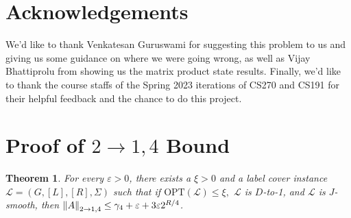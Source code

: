 \documentclass[10pt]{article}
\newcommand{\Ell}{\mathcal{L}}
\newtheorem{theorem}{Theorem}
\begin{document}
\section*{Acknowledgements}
We'd like to thank Venkatesan Guruswami for suggesting this problem to us and giving us some guidance on where we were going wrong, as well as Vijay Bhattiprolu from showing us the matrix product state results. Finally, we'd like to thank the course staffs of the Spring 2023 iterations of CS270 and CS191 for their helpful feedback and the chance to do this project.




\appendix
\section{Proof of $2\to1,4$ Bound}
\begin{theorem}
    For every $\varepsilon > 0$, there exists a $\xi > 0$ and a label cover instance $\mathcal{L} = (G, [L], [R], \Sigma)$ such that if $\textrm{OPT}(\mathcal{L}) \leq \xi,$ $\Ell$ is $D$-to-1, and $\Ell$ is $J$-smooth, then $\norm{A}_{2 \to 1, 4} \leq \gamma_4 + \varepsilon + 3 \varepsilon 2^{R/4}$.
\end{theorem}
\end{document}

